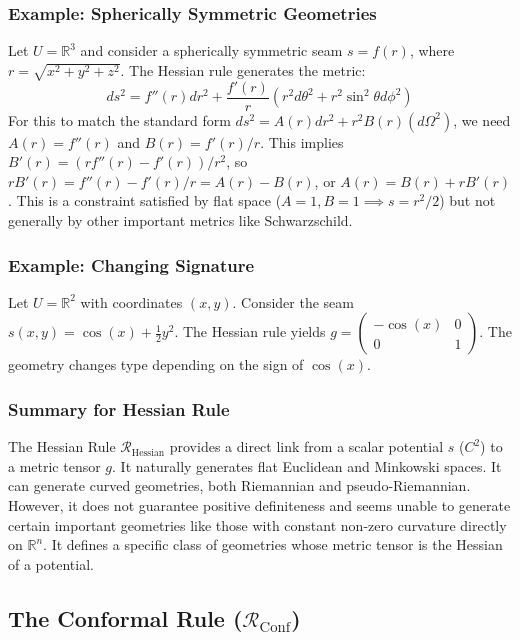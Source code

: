 \documentclass[twoside,twocolumn]{article}
\begin{document}
\subsubsection{Example: Spherically Symmetric Geometries}
Let $U = \mathbb{R}^3$ and consider a spherically symmetric seam $s = f(r)$, where $r = \sqrt{x^2+y^2+z^2}$. The Hessian rule generates the metric:
$$ ds^2 = f''(r) dr^2 + \frac{f'(r)}{r} (r^2 d\theta^2 + r^2 \sin^2\theta d\phi^2) $$
For this to match the standard form $ds^2 = A(r) dr^2 + r^2 B(r) (d\Omega^2)$, we need $A(r) = f''(r)$ and $B(r) = f'(r)/r$. This implies $B'(r) = (r f''(r) - f'(r))/r^2$, so $r B'(r) = f''(r) - f'(r)/r = A(r) - B(r)$, or $A(r) = B(r) + r B'(r)$. This is a constraint satisfied by flat space ($A=1, B=1 \implies s=r^2/2$) but not generally by other important metrics like Schwarzschild.

\subsubsection{Example: Changing Signature}
Let $U = \mathbb{R}^2$ with coordinates $(x, y)$. Consider the seam $s(x, y) = \cos(x) + \frac{1}{2} y^2$. The Hessian rule yields $g = \begin{pmatrix} -\cos(x) & 0 \\ 0 & 1 \end{pmatrix}$. The geometry changes type depending on the sign of $\cos(x)$.

\subsubsection{Summary for Hessian Rule}
The Hessian Rule $\mathcal{R}_{\text{Hessian}}$ provides a direct link from a scalar potential $s$ ($C^2$) to a metric tensor $g$. It naturally generates flat Euclidean and Minkowski spaces. It can generate curved geometries, both Riemannian and pseudo-Riemannian. However, it does not guarantee positive definiteness and seems unable to generate certain important geometries like those with constant non-zero curvature directly on $\mathbb{R}^n$. It defines a specific class of geometries whose metric tensor is the Hessian of a potential.

\subsection{The Conformal Rule ($\mathcal{R}_{\text{Conf}}$)}
\setcounter{definition}{0}
\end{document}
